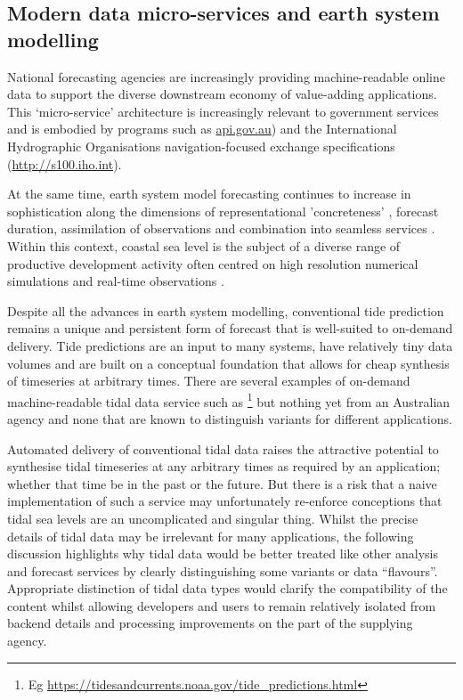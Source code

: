 \subsection{Modern data micro-services and earth system modelling}
National forecasting agencies are increasingly providing machine-readable online data to support the diverse downstream economy of value-adding applications.
This `micro-service' architecture \citep{BCG2020} is increasingly relevant to government services and is embodied by programs such as  \url{api.gov.au}) and the International Hydrographic Organisations  navigation-focused exchange specifications (\url{http://s100.iho.int}).

 
At the same time, earth system model forecasting continues to increase in sophistication along the dimensions of representational 'concreteness' \citep{Petersen:2012kp}, forecast duration, assimilation of observations and combination into seamless services \cite{BOM2020}.
Within this context, coastal sea level is the subject of a diverse range of productive development activity often centred on high resolution numerical simulations and real-time observations \citep{10.3389/fmars.2019.00437}. 


Despite all the advances in earth system modelling, conventional tide prediction remains a unique and persistent form of forecast that is well-suited to on-demand delivery.  Tide predictions are an input to many systems, have relatively tiny data volumes and are built on a conceptual foundation that allows for cheap synthesis of timeseries at arbitrary times.    There are several examples of on-demand machine-readable tidal data service such as  \footnote{Eg \url{https://tidesandcurrents.noaa.gov/tide_predictions.html}} but nothing yet from an Australian agency and none that are known to distinguish variants for different applications.


Automated delivery of conventional tidal data raises the attractive potential to synthesise tidal timeseries at any arbitrary times as required by an application; whether that time be in the past or the future.   But there is a risk that a naive implementation of such a service may unfortunately re-enforce conceptions that tidal sea levels are an uncomplicated and singular thing.    
Whilst the precise details of tidal data may be irrelevant for many applications, the following discussion highlights why tidal data would be better treated like other analysis and forecast services by clearly distinguishing some variants or data ``flavours''. 
Appropriate distinction of tidal data types would clarify the compatibility of the content whilst allowing developers and users to remain relatively isolated from backend details and processing improvements on the part of the supplying agency.


